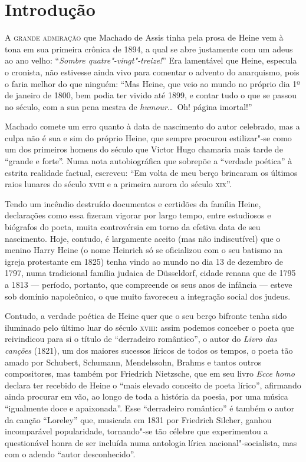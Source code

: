 
\chapter[Introdução, por Marcus Mazzari]{Introdução}

\textsc{A grande admiração} que Machado de Assis tinha pela prosa de Heine vem à
tona em sua primeira crônica de 1894, a qual se abre justamente com um
adeus ao ano velho: “\textit{Sombre quatre"-vingt"-treize!}” Era
lamentável que Heine, especula o cronista, não estivesse ainda vivo
para comentar o advento do anarquismo, pois o faria melhor do que
ninguém: “Mas Heine, que veio ao mundo no próprio dia 1º de janeiro de
1800, bem podia ter vivido até 1899, e contar tudo o que se passou no
século, com a sua pena mestra de \textit{humour}\ldots\ Oh! página
imortal!”

Machado comete um erro quanto à data de nascimento do autor celebrado,
mas a culpa não é sua e sim do próprio Heine, que sempre procurou
estilizar"-se como um dos primeiros homens do século que Victor Hugo
chamaria mais tarde  de “grande e forte”. Numa nota autobiográfica que
sobrepõe a “verdade poética” à estrita realidade factual, escreveu: “Em
volta de meu berço brincaram os últimos raios lunares do século \textsc{xviii} e
a primeira aurora do século \textsc{xix}”.

Tendo um incêndio destruído documentos e certidões da família Heine,
declarações como essa fizeram vigorar por largo tempo, entre estudiosos
e biógrafos do poeta, muita controvérsia em torno da efetiva data de
seu nascimento. Hoje, contudo, é largamente aceito (mas não
indiscutível) que o menino Harry Heine (o nome Heinrich só se
oficializou com o seu batismo na igreja protestante em 1825) tenha
vindo ao mundo no dia 13 de dezembro de 1797, numa tradicional família
judaica de Düsseldorf, cidade renana que de 1795 a 1813 --- período,
portanto, que compreende os seus anos de infância --- esteve sob domínio
napoleônico, o que muito favoreceu a integração social dos judeus.

Contudo, a verdade poética de Heine quer que o seu berço bifronte tenha
sido iluminado pelo último luar do século \textsc{xviii}: assim podemos conceber
o poeta que reivindicou para si o título de “derradeiro romântico”, o
autor do \textit{Livro das canções} (1821), um dos maiores sucessos
líricos de todos os tempos, o poeta tão amado por Schubert, Schumann,
Mendelssohn, Brahms e tantos outros compositores, mas também por
Friedrich Nietzsche, que em seu livro \textit{Ecce homo} declara ter
recebido de Heine o “mais elevado conceito de poeta lírico”, afirmando
ainda procurar em vão, ao longo de toda a história da poesia, por uma
música “igualmente doce e apaixonada”. Esse “derradeiro romântico” é
também o autor da canção “Loreley” que, musicada em 1831 por Friedrich
Silcher, ganhou incomparável popularidade, tornando"-se tão célebre
que experimentou a questionável honra de ser incluída numa antologia
lírica nacional"-socialista, mas com o adendo “autor desconhecido”.

